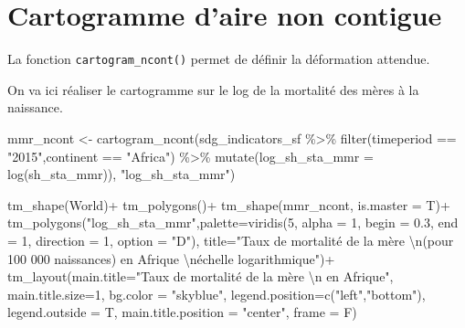 \documentclass[
]{book}
\newenvironment{Shaded}{\begin{snugshade}}{\end{snugshade}}
\newcommand{\AttributeTok}[1]{\textcolor[rgb]{0.77,0.63,0.00}{#1}}
\newcommand{\DecValTok}[1]{\textcolor[rgb]{0.00,0.00,0.81}{#1}}
\newcommand{\FloatTok}[1]{\textcolor[rgb]{0.00,0.00,0.81}{#1}}
\newcommand{\FunctionTok}[1]{\textcolor[rgb]{0.00,0.00,0.00}{#1}}
\newcommand{\NormalTok}[1]{#1}
\newcommand{\OtherTok}[1]{\textcolor[rgb]{0.56,0.35,0.01}{#1}}
\newcommand{\SpecialCharTok}[1]{\textcolor[rgb]{0.00,0.00,0.00}{#1}}
\newcommand{\StringTok}[1]{\textcolor[rgb]{0.31,0.60,0.02}{#1}}
\begin{document}
\hypertarget{cartogramme-daire-non-contigue}{%
\section{Cartogramme d'aire non contigue}\label{cartogramme-daire-non-contigue}}

La fonction \texttt{cartogram\_ncont()} permet de définir la déformation attendue.

On va ici réaliser le cartogramme sur le log de la mortalité des mères à la naissance.

\begin{Shaded}
\begin{Highlighting}[]
\NormalTok{mmr\_ncont }\OtherTok{\textless{}{-}} \FunctionTok{cartogram\_ncont}\NormalTok{(sdg\_indicators\_sf }\SpecialCharTok{\%\textgreater{}\%} 
                               \FunctionTok{filter}\NormalTok{(timeperiod }\SpecialCharTok{==} \StringTok{"2015"}\NormalTok{,continent }\SpecialCharTok{==} \StringTok{"Africa"}\NormalTok{) }\SpecialCharTok{\%\textgreater{}\%} 
                               \FunctionTok{mutate}\NormalTok{(}\AttributeTok{log\_sh\_sta\_mmr =} \FunctionTok{log}\NormalTok{(sh\_sta\_mmr)),}
                             \StringTok{"log\_sh\_sta\_mmr"}\NormalTok{)}
\end{Highlighting}
\end{Shaded}

\begin{Shaded}
\begin{Highlighting}[]
\FunctionTok{tm\_shape}\NormalTok{(World)}\SpecialCharTok{+}
  \FunctionTok{tm\_polygons}\NormalTok{()}\SpecialCharTok{+}
  \FunctionTok{tm\_shape}\NormalTok{(mmr\_ncont, }\AttributeTok{is.master =}\NormalTok{ T)}\SpecialCharTok{+}
  \FunctionTok{tm\_polygons}\NormalTok{(}\StringTok{"log\_sh\_sta\_mmr"}\NormalTok{,}\AttributeTok{palette=}\FunctionTok{viridis}\NormalTok{(}\DecValTok{5}\NormalTok{, }\AttributeTok{alpha =} \DecValTok{1}\NormalTok{, }\AttributeTok{begin =} \FloatTok{0.3}\NormalTok{, }\AttributeTok{end =} \DecValTok{1}\NormalTok{, }\AttributeTok{direction =} \DecValTok{1}\NormalTok{, }\AttributeTok{option =} \StringTok{"D"}\NormalTok{),}
              \AttributeTok{title=}\StringTok{"Taux de mortalité de la mère }\SpecialCharTok{\textbackslash{}n}\StringTok{(pour 100 000 naissances) en Afrique }\SpecialCharTok{\textbackslash{}n}\StringTok{échelle logarithmique"}\NormalTok{)}\SpecialCharTok{+}
  \FunctionTok{tm\_layout}\NormalTok{(}\AttributeTok{main.title=}\StringTok{"Taux de mortalité de la mère }\SpecialCharTok{\textbackslash{}n}\StringTok{ en Afrique"}\NormalTok{,}
            \AttributeTok{main.title.size=}\DecValTok{1}\NormalTok{,}
            \AttributeTok{bg.color =} \StringTok{"skyblue"}\NormalTok{,}
            \AttributeTok{legend.position=}\FunctionTok{c}\NormalTok{(}\StringTok{"left"}\NormalTok{,}\StringTok{"bottom"}\NormalTok{),}
            \AttributeTok{legend.outside =}\NormalTok{ T,}
            \AttributeTok{main.title.position =} \StringTok{"center"}\NormalTok{,}
            \AttributeTok{frame =}\NormalTok{ F)}
\end{Highlighting}
\end{Shaded}
\end{document}
